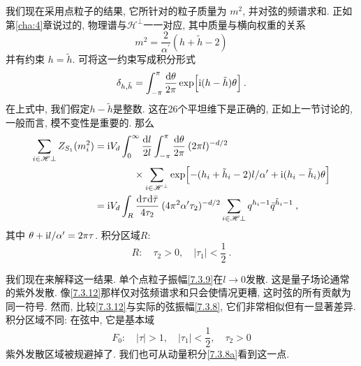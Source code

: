 我们现在采用点粒子的结果, 它所针对的粒子质量为 $m^{2}$, 并对弦的频谱求和. 正如第\ref{cha:4}章说过的, 物理谱与$\mathscr{H}^{\perp}$一一对应, 
其中质量与横向权重的关系
\begin{equation}
	m^{2}=\frac{2}{\alpha^{\prime}}(h+\tilde{h}-2) \label{7.3.10}
\end{equation}
并有约束 $h=\tilde{h}$. 可将这一约束写成积分形式
\begin{equation}
	\delta_{h, \tilde{h}}=\int_{-\pi}^{\pi} \frac{\mathrm{d} \theta}{2 \pi} \exp \Bigl[\mathrm{i}(h-\tilde{h}) \theta\Bigr] \:. \label{7.3.11}
\end{equation}
在上式中, 我们假定$h-\tilde{h}$是整数. 这在26个平坦维下是正确的, 正如上一节讨论的, 一般而言, 模不变性是重要的. 那么
\begin{align}
	\sum_{i \in \mathscr{H} \perp} Z_{S_{1}}(m_{i}^{2}) &= \mathrm{i} V_{d} \int_{0}^{\infty} \frac{\mathrm{d} l}{2 l} 
	\int_{-\pi}^{\pi} \frac{\mathrm{d} \theta}{2 \pi} \: (2 \pi l)^{-d / 2} \nonumber \\
	&\qquad \qquad  \times \sum_{i \in \mathscr{H}^{\perp}} \exp \Bigl[-(h_{i}+\tilde{h}_{i}-2) l / \alpha^{\prime}
	+\mathrm{i}(h_{i}-\tilde{h}_{i}) \theta\Bigr]  \nonumber \\
	&=\mathrm{i} V_{d} \int_{R} \frac{\mathrm{d} \tau \mathrm{d} \bar{\tau}}{4 \tau_{2}}\: (4 \pi^{2} \alpha^{\prime} \tau_{2})^{-d / 2} 
	\sum_{i \in \mathscr{H} \perp} q^{h_{i}-1} \bar{q}^{\tilde{h}_{i}-1} \:, \label{7.3.12}
\end{align}
其中 $\theta+\mathrm{i} l / \alpha^{\prime}=2 \pi \tau$. 积分区域$R$:
\begin{equation}
	R: \quad \tau_{2}>0, \quad |\tau_{1}|<\frac{1}{2} \:. \label{7.3.13}
\end{equation}

我们现在来解释这一结果. 单个点粒子振幅\eqref{7.3.9}在$l \rightarrow 0$发散. 这是量子场论通常的紫外发散. 
像\eqref{7.3.12}那样仅对弦频谱求和只会使情况更糟, 这时弦的所有贡献为同一符号. 然而, 比较\eqref{7.3.12}与实际的弦振幅\eqref{7.3.8}, 
它们非常相似但有一显著差异. 积分区域不同: 在弦中, 它是基本域
\begin{equation}
	F_{0}: \quad|\tau|>1, \quad |\tau_{1}|<\frac{1}{2}, \quad \tau_{2}>0 \label{7.3.14}
\end{equation}
紫外发散区域被规避掉了. 我们也可从动量积分\eqref{7.3.8a}看到这一点. 

